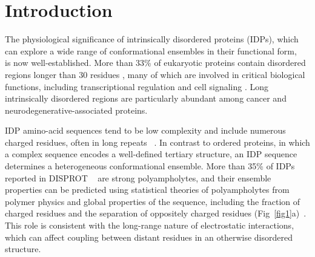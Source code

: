 \documentclass[journal=jacsat,manuscript=article]{achemso}
\begin{document}

\section*{Introduction}

The physiological significance of intrinsically disordered proteins (IDPs), which can explore a wide range of conformational ensembles in their functional form, ~\cite {Uversky2013a,Panchenko2015,Ward2004a,Dyson2005a} is now well-established. More than 33\% of eukaryotic proteins contain disordered regions longer than 30 residues \cite{Ward2004a}, many of which are involved in critical biological functions, including transcriptional regulation and cell signaling \cite{Dunker2005}.  Long intrinsically disordered regions are particularly abundant among cancer and neurodegenerative-associated proteins\cite{Habchi2014,Babu2011}.  

IDP amino-acid sequences tend to be low complexity and include numerous charged residues, often in long repeats ~\cite{Uversky2013a}. In contrast to ordered proteins, in which a complex sequence encodes a well-defined tertiary structure, an IDP sequence determines a heterogeneous conformational ensemble.  More than 35\% of 
IDPs reported in DISPROT ~\cite {Sickmeier2007a} are strong polyampholytes, and their ensemble properties can be predicted using statistical theories of polyampholytes from polymer physics and global properties of the sequence, including the fraction of charged residues and the separation of oppositely charged residues (Fig~\ref{fig1}a)~\cite{Das2015,Das2013a}.  This role is consistent with the long-range nature of electrostatic interactions, which can affect coupling between distant residues in an otherwise disordered structure.  
\end{document}
